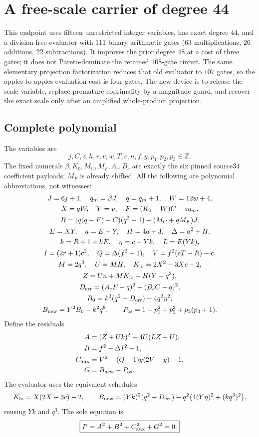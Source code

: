 \section{A free-scale carrier of degree 44}
\label{sec:free-scale15}
This endpoint uses fifteen unrestricted integer variables, has exact degree
$44$, and a division-free evaluator with $111$ binary arithmetic gates
($63$ multiplications, $26$ additions, $22$ subtractions).
It improves the prior degree $48$ at a cost of three gates; it does not
Pareto-dominate the retained $108$-gate circuit. The same elementary
projection factorization reduces that old evaluator to $107$ gates,
so the apples-to-apples evaluation cost is four gates.
The new device is to release the scale variable, replace premature
coprimality by a magnitude guard, and recover the exact scale only after
an amplified whole-product projection.

\subsection{Complete polynomial}
The variables are
\[
 j,C,z,h,r,v,w,T,c,n,f,y,p_1,p_2,p_3\in\mathbb Z.
\]
The fixed numerals $\beta,K_0,M_C,M_F,A_c,B_c$ are exactly the six
pinned source34 coefficient payloads; $M_F$ is already shifted.
All the following are polynomial abbreviations, not witnesses:
\begin{gather*}
 J=6j+1,\quad q_m=\beta J,\quad q=q_m+1,\quad W=12w+4,\\
 X=qW,\quad Y=v,\quad F=(K_0+W)C-zq_m,\\
 R=(q(q-F)-C)(q^2-1)+(M_C+qM_F)J,\\
 E=XY,\quad a=E+Y,\quad H=4a+3,\quad \Delta=a^2+H,\\
 k=R+1+hE,\quad \eta=c-Yk,\quad L=E(Yk),\\
 I=(2r+1)c^2,\quad Q=\Delta(f^2-1),\quad V=f^2(cT-R)-c,\\
 M=2q^3,\quad U=MH,\quad K_{\rm lo}=2X^2-3Xc-2,\\
 Z=Un+MK_{\rm lo}+H(Y-q^3),\\
 D_{\rm err}=(A_cF-q)^2+(B_cC-q)^2,\\
 B_0=k^2(q^2-D_{\rm err})-4q^2\eta^2,\\
 B_{\rm new}=Y^2B_0-k^2q^8,\qquad
 P_{\rm os}=1+p_1^2+p_2^2+p_3(p_3+1).
\end{gather*}
Define the residuals
\begin{align*}
 A&=(Z+Uk)^2+4U(LZ-U),\\
 B&=f^2-\Delta I^2-1,\\
 C_{\rm aux}&=V^2-(Q-1)y(2V+y)-1,\\
 G&=B_{\rm new}-P_{\rm os}.
\end{align*}
The evaluator uses the equivalent schedules
\[
 K_{\rm lo}=X(2X-3c)-2,\qquad
 B_{\rm new}=(Yk)^2(q^2-D_{\rm err})
 -q^2\bigl(4(Y\eta)^2+(kq^3)^2\bigr),
\]
reusing $Yk$ and $q^3$. The sole equation is
\[
 \boxed{P=A^2+B^2+C_{\rm aux}^2+G^2=0.}
\]

